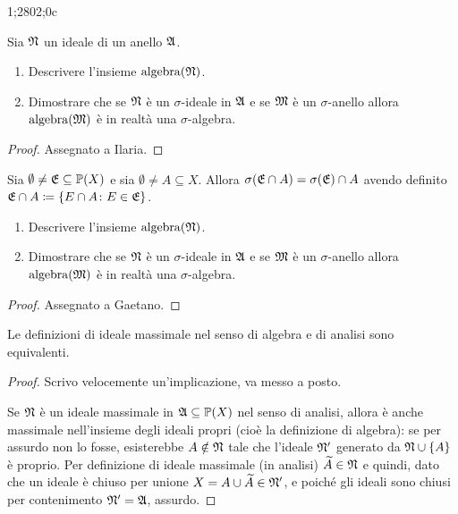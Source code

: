 1;2802;0c\documentclass[../EserciziIstituzioniAnalisi.tex]{subfiles}
\begin{document}
\begin{exercise}[13/10/2016]
Sia $\mathfrak N$ un ideale di un anello $\mathfrak A$.
\begin{enumerate}
\item Descrivere l'insieme $\operatorname{algebra}(\mathfrak N)$.
\item Dimostrare che se $\mathfrak N$ è un $\sigma$-ideale in $\mathfrak A$ e se $\mathfrak M$ è un $\sigma$-anello allora $\operatorname{algebra}(\mathfrak M)$ è in realtà una $\sigma$-algebra.
\end{enumerate}
\end{exercise}
\begin{proof}
  Assegnato a Ilaria.
\end{proof}

\begin{exercise}[2016-10-13]
Sia $\emptyset \neq \mathfrak E \subseteq \mathbb P(X)$ e sia $\emptyset \neq A \subseteq X$.
Allora $\sigma(\mathfrak E \cap A) = \sigma(\mathfrak E) \cap A$ avendo definito $\mathfrak E \cap A \coloneqq \left\lbrace E \cap A \colon E \in \mathfrak E\right\rbrace$.
\begin{enumerate}
\item Descrivere l'insieme $\operatorname{algebra}(\mathfrak N)$.
\item Dimostrare che se $\mathfrak N$ è un $\sigma$-ideale in $\mathfrak A$ e se $\mathfrak M$ è un $\sigma$-anello allora $\operatorname{algebra}(\mathfrak M)$ è in realtà una $\sigma$-algebra.
\end{enumerate}
\end{exercise}
\begin{proof}
Assegnato a Gaetano.
\end{proof}

\begin{exercise}[13/10/2016]
  Le definizioni di ideale massimale nel senso di algebra e di analisi sono equivalenti.
\end{exercise}
\begin{proof}
  Scrivo velocemente un'implicazione, va messo a posto.

  Se $\mathfrak N$ è un ideale massimale in $\mathfrak A\subseteq \mathbb P(X)$ nel senso di analisi, allora è anche massimale nell'insieme degli ideali propri (cioè la definizione di algebra): se per assurdo non lo fosse, esisterebbe $A\notin \mathfrak N$ tale che l'ideale $\mathfrak N'$ generato da $\mathfrak N\cup \{A\}$ è proprio. Per definizione di ideale massimale (in analisi) $\widetilde{A}\in \mathfrak N$ e quindi, dato che un ideale è chiuso per unione $X=A\cup\widetilde{A}\in \mathfrak N'$, e poiché gli ideali sono chiusi per contenimento $\mathfrak N'=\mathfrak A$, assurdo.
\end{proof}
  
\end{document}
